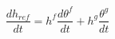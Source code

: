 \begin{equation}
\frac{dh_{ref}}{dt} = h^f \frac{d\theta^f }{dt} + h^g \frac{\theta^g }{dt}
\end{equation}